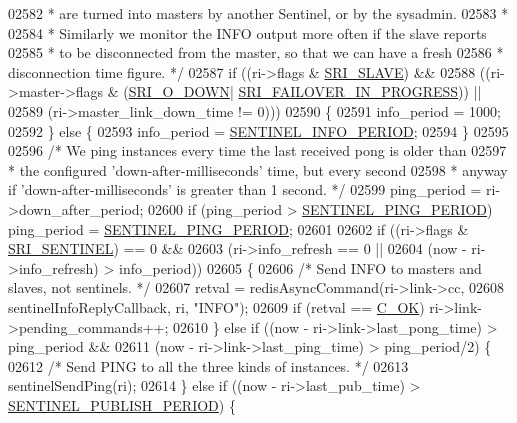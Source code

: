 \begin{DoxyCode}
{{{{{{{{{{{{{{{{{{{{{{{{{{{{{{{{{{{{{{{{{{{{{{{{{{{{{{{{{02582 \textcolor{comment}{     * are turned into masters by another Sentinel, or by the sysadmin.}
02583 \textcolor{comment}{     *}
02584 \textcolor{comment}{     * Similarly we monitor the INFO output more often if the slave reports}
02585 \textcolor{comment}{     * to be disconnected from the master, so that we can have a fresh}
02586 \textcolor{comment}{     * disconnection time figure. */}
02587     \textcolor{keywordflow}{if} ((ri->flags & \hyperlink{sentinel_8c_a4b9db21eda79d49bd9fdf2cf7b3178e8}{SRI\_SLAVE}) &&
02588         ((ri->master->flags & (\hyperlink{sentinel_8c_a3bbbca05543cd9d9f86d276e2c7c719c}{SRI\_O\_DOWN}|
      \hyperlink{sentinel_8c_a0546b63633196f09fcd90957243b0798}{SRI\_FAILOVER\_IN\_PROGRESS})) ||
02589          (ri->master\_link\_down\_time != 0)))
02590     \{
02591         info\_period = 1000;
02592     \} \textcolor{keywordflow}{else} \{
02593         info\_period = \hyperlink{sentinel_8c_ac6a2144aa06344ed8547176a4e3cfaa5}{SENTINEL\_INFO\_PERIOD};
02594     \}
02595 
02596     \textcolor{comment}{/* We ping instances every time the last received pong is older than}
02597 \textcolor{comment}{     * the configured 'down-after-milliseconds' time, but every second}
02598 \textcolor{comment}{     * anyway if 'down-after-milliseconds' is greater than 1 second. */}
02599     ping\_period = ri->down\_after\_period;
02600     \textcolor{keywordflow}{if} (ping\_period > \hyperlink{sentinel_8c_a9e22409355fa7a4db7f3a43fbe2d9101}{SENTINEL\_PING\_PERIOD}) ping\_period = 
      \hyperlink{sentinel_8c_a9e22409355fa7a4db7f3a43fbe2d9101}{SENTINEL\_PING\_PERIOD};
02601 
02602     \textcolor{keywordflow}{if} ((ri->flags & \hyperlink{sentinel_8c_a8ed55207b2af5d2dd314c951ef253f64}{SRI\_SENTINEL}) == 0 &&
02603         (ri->info\_refresh == 0 ||
02604         (now - ri->info\_refresh) > info\_period))
02605     \{
02606         \textcolor{comment}{/* Send INFO to masters and slaves, not sentinels. */}
02607         retval = redisAsyncCommand(ri->link->cc,
02608             sentinelInfoReplyCallback, ri, \textcolor{stringliteral}{"INFO"});
02609         \textcolor{keywordflow}{if} (retval == \hyperlink{server_8h_a303769ef1065076e68731584e758d3e1}{C\_OK}) ri->link->pending\_commands++;
02610     \} \textcolor{keywordflow}{else} \textcolor{keywordflow}{if} ((now - ri->link->last\_pong\_time) > ping\_period &&
02611                (now - ri->link->last\_ping\_time) > ping\_period/2) \{
02612         \textcolor{comment}{/* Send PING to all the three kinds of instances. */}
02613         sentinelSendPing(ri);
02614     \} \textcolor{keywordflow}{else} \textcolor{keywordflow}{if} ((now - ri->last\_pub\_time) > \hyperlink{sentinel_8c_a062c8bab2521f90dac2df11cf77c3bf0}{SENTINEL\_PUBLISH\_PERIOD}) \{
}}}}}}}}}}}}}}}}}}}}}}}}}}}}}}}}}}}}}}}}}}}}}}}}}}}}}}}}}
\end{DoxyCode}
